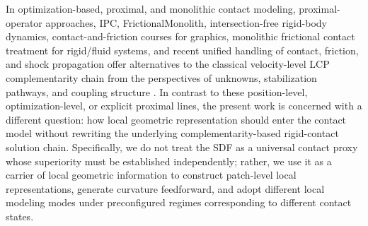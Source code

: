 In optimization-based, proximal, and monolithic contact modeling, proximal-operator approaches, IPC, FrictionalMonolith, intersection-free rigid-body dynamics, contact-and-friction courses for graphics, monolithic frictional contact treatment for rigid/fluid systems, and recent unified handling of contact, friction, and shock propagation offer alternatives to the classical velocity-level LCP complementarity chain from the perspectives of unknowns, stabilization pathways, and coupling structure \cite{proximalcontact2017,li2020ipc,frictionalmonolith2021,contactgraphicscourse2021,intersectionfree2021,sphcontact2023,unifiedshock2023,chen2024primaldual}. In contrast to these position-level, optimization-level, or explicit proximal lines, the present work is concerned with a different question: how local geometric representation should enter the contact model without rewriting the underlying complementarity-based rigid-contact solution chain. Specifically, we do not treat the SDF as a universal contact proxy whose superiority must be established independently; rather, we use it as a carrier of local geometric information to construct patch-level local representations, generate curvature feedforward, and adopt different local modeling modes under preconfigured regimes corresponding to different contact states.
